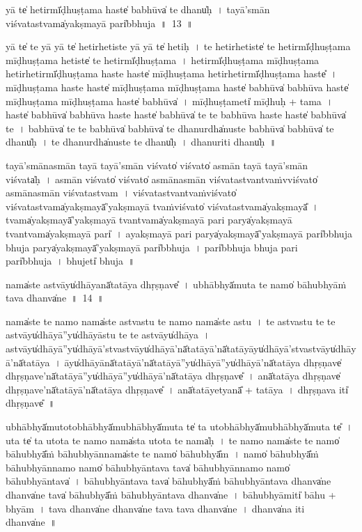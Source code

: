 \documentclass[parskip, DIV=14]{scrartcl}
\begin{document}
{\vspace{0.5cm}
yā te̍ he॒tirmī̍ḍhuṣṭama॒ haste̍ ba॒bhūva̍ te॒ dhanu̍ḥ~।
tayā॒'smān vi॒śvata॒stvama̍ya॒kṣmayā॒ pari̍bbhuja~॥~13~॥

yā te̍ te॒ yā yā te̍ he॒tirhe॒tiste॒ yā yā te̍ he॒tiḥ~।
te॒ he॒tirhe॒tiste̍ te he॒tirmī̍ḍhuṣṭama mīḍhuṣṭama he॒tiste̍ te he॒tirmī̍ḍhuṣṭama~।
he॒tirmī̍ḍhuṣṭama mīḍhuṣṭama he॒tirhe॒tirmī̍ḍhuṣṭama॒ haste॒ haste̍ mīḍhuṣṭama he॒tirhe॒tirmī̍ḍhuṣṭama॒ haste̎~।
mī॒ḍhu॒ṣṭa॒ma॒ haste॒ haste̍ mīḍhuṣṭama mīḍhuṣṭama॒ haste̍ ba॒bhūva̍ ba॒bhūva॒ haste̍ mīḍhuṣṭama mīḍhuṣṭama॒ haste̍ ba॒bhūva̍~।
mī॒ḍhu॒ṣṭa॒meti̍ mīḍhuḥ + ta॒ma॒~।
haste̍ ba॒bhūva̍ ba॒bhūva॒ haste॒ haste̍ ba॒bhūva̍ te te ba॒bhūva॒ haste॒ haste̍ ba॒bhūva̍ te~। %
ba॒bhūva̍ te te ba॒bhūva̍ ba॒bhūva̍ te॒ dhanu॒rdha̍nuste ba॒bhūva̍ ba॒bhūva̍ te॒ dhanu̍ḥ~।
te॒ dhanu॒rdha̍nuste te॒ dhanu̍ḥ~।
dha॒nuriti॒ dhanu̍ḥ~॥ 

tayā॒'smāna॒smān tayā॒ tayā॒'smān vi॒śvato̍ vi॒śvato̍ a॒smān tayā॒ tayā॒'smān vi॒śvata̍ḥ~। %
a॒smān vi॒śvato̍ vi॒śvato̍ a॒smāna॒smān vi॒śvata॒stvantvaṁvvi॒śvato̍ a॒smāna॒smān vi॒śvata॒stvam~। %
vi॒śvata॒stvantvaṁvi॒śvato̍ vi॒śvata॒stvama̍ya॒kṣmayā̍'ya॒kṣmayā॒ tvaṁvi॒śvato̍ vi॒śvata॒stvama̍ya॒kṣmayā̎~। %
tvama̍ya॒kṣmayā̍'ya॒kṣmayā॒ tvantvama̍ya॒kṣmayā॒ pari॒ parya̍ya॒kṣmayā॒ tvantvama̍ya॒kṣmayā॒ pari̍~।
a॒ya॒kṣmayā॒ pari॒ parya̍ya॒kṣmayā̍'ya॒kṣmayā॒ pari̍bbhuja bhuja॒ parya̍ya॒kṣmayā̍'ya॒kṣmayā॒ pari̍bbhuja~।
pari̍bbhuja bhuja॒ pari॒ pari̍bbhuja~।
bhu॒jeti̍ bhuja~॥ 

\vspace{0.5cm}
nama̍ste a॒stvāyu̍dhā॒yanā̍tatāya dhṛ॒ṣṇave̎~।
u॒bhābhyā̍mu॒ta te॒ namo̍ bā॒hubhyā॒ṁ tava॒ dhanva̍ne~॥~14~॥

nama̍ste te॒ namo॒ nama̍ste astvastu te॒ namo॒ nama̍ste astu~।
te॒ a॒stva॒stu॒ te॒ te॒ a॒stvāyu̍dhā॒yā''yu̍dhāyāstu te te a॒stvāyu̍dhāya~।
a॒stvāyu̍dhā॒yā''yu̍dhāyā'stva॒stvāyu̍dhā॒yā'nā̍tatā॒yā'nā̍tatā॒yāyu̍dhāyā'stva॒stvāyu̍dhā॒yā'nā̍tatāya~।
āyu̍dhā॒yānā̍tatā॒yā'nā̍tatā॒yā''yu̍dhā॒yā''yu̍dhā॒yā'nā̍tatāya dhṛ॒ṣṇave̍ 
dhṛ॒ṣṇave'nā̍tatā॒yā''yu̍dhā॒yā''yu̍dhā॒yā'nā̍tatāya dhṛ॒ṣṇave̎~।
anā̍tatāya dhṛ॒ṣṇave̍ dhṛ॒ṣṇave'nā̍tatā॒yā'nā̍tatāya dhṛ॒ṣṇave̎~। %
anā̍tatā॒yetyanā̎ + ta॒tā॒ya॒~।
dhṛ॒ṣṇava॒ iti̍  dhṛ॒ṣṇave̎~॥ 

u॒bhābhyā̍mu॒totobhābhyā̍mu॒bhābhyā̍mu॒ta te̍ ta u॒tobhābhyā̍mu॒bhābhyā̍mu॒ta te̎~।
u॒ta te̍ ta u॒tota te॒ namo॒ nama̍sta u॒tota te॒ nama̍ḥ~।
te॒ namo॒ nama̍ste te॒ namo̍ bā॒hubhyā̎ṁ bā॒hubhyā॒nnama̍ste te॒ namo̍ bā॒hubhyā̎m~।
namo̍ bā॒hubhyā̎ṁ bā॒hubhyā॒nnamo॒ namo̍  bā॒hubhyā॒ntava॒ tava̍ bā॒hubhyā॒nnamo॒ namo̍  bā॒hubhyā॒ntava̍~।
bā॒hubhyā॒ntava॒ tava̍ bā॒hubhyā̎ṁ bā॒hubhyā॒ntava॒ dhanva̍ne॒ dhanva̍ne॒ tava̍ bā॒hubhyā̎ṁ bā॒hubhyā॒ntava॒ dhanva̍ne~।
bā॒hubhyā॒miti̍ bā॒hu + bhyā॒m~।
tava॒ dhanva̍ne॒ dhanva̍ne॒ tava॒ tava॒ dhanva̍ne~।
dhanva̍na iti॒ dhanva̍ne~॥ 


}
\end{document}
